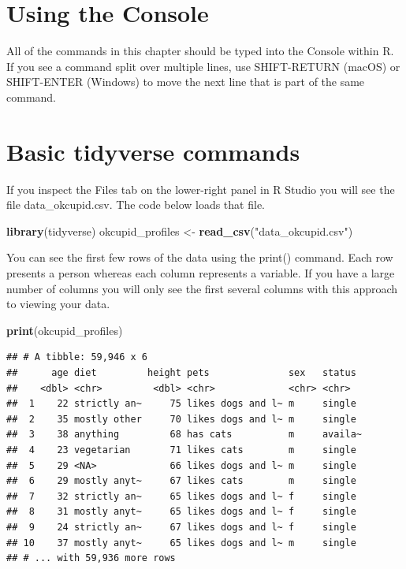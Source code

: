 \documentclass[
]{krantz}
\makeatletter
\newenvironment{Shaded}{\begin{snugshade}}{\end{snugshade}}
\newcommand{\KeywordTok}[1]{\textcolor[rgb]{0.27,0.27,0.27}{\textbf{#1}}}
\newcommand{\NormalTok}[1]{#1}
\newcommand{\StringTok}[1]{\textcolor[rgb]{0.5,0.5,0.5}{#1}}
\newenvironment{kframe}{%
\medskip{}
\setlength{\fboxsep}{.8em}
 \def\at@end@of@kframe{}%
 \ifinner\ifhmode%
  \def\at@end@of@kframe{\end{minipage}}%
  \begin{minipage}{\columnwidth}%
 \fi\fi%
 \def\FrameCommand##1{\hskip\@totalleftmargin \hskip-\fboxsep
 \colorbox{shadecolor}{##1}\hskip-\fboxsep
     \hskip-\linewidth \hskip-\@totalleftmargin \hskip\columnwidth}%
 \MakeFramed {\advance\hsize-\width
   \@totalleftmargin\z@ \linewidth\hsize
   \@setminipage}}%
 {\par\unskip\endMakeFramed%
 \at@end@of@kframe}
\renewenvironment{Shaded}{\begin{kframe}}{\end{kframe}}
\makeatother
\begin{document}
\hypertarget{using-the-console}{%
\section{Using the Console}\label{using-the-console}}

All of the commands in this chapter should be typed into the Console within R. If you see a command split over multiple lines, use SHIFT-RETURN (macOS) or SHIFT-ENTER (Windows) to move the next line that is part of the same command.

\hypertarget{basic-tidyverse-commands}{%
\section{Basic tidyverse commands}\label{basic-tidyverse-commands}}

If you inspect the Files tab on the lower-right panel in R Studio you will see the file data\_okcupid.csv. The code below loads that file.

\begin{Shaded}
\begin{Highlighting}[]
\KeywordTok{library}\NormalTok{(tidyverse)}
\NormalTok{okcupid_profiles <-}\StringTok{ }\KeywordTok{read_csv}\NormalTok{(}\StringTok{"data_okcupid.csv"}\NormalTok{)}
\end{Highlighting}
\end{Shaded}

You can see the first few rows of the data using the print() command. Each row presents a person whereas each column represents a variable. If you have a large number of columns you will only see the first several columns with this approach to viewing your data.

\begin{Shaded}
\begin{Highlighting}[]
\KeywordTok{print}\NormalTok{(okcupid_profiles)}
\end{Highlighting}
\end{Shaded}

\begin{verbatim}
## # A tibble: 59,946 x 6
##      age diet         height pets              sex   status 
##    <dbl> <chr>         <dbl> <chr>             <chr> <chr>  
##  1    22 strictly an~     75 likes dogs and l~ m     single 
##  2    35 mostly other     70 likes dogs and l~ m     single 
##  3    38 anything         68 has cats          m     availa~
##  4    23 vegetarian       71 likes cats        m     single 
##  5    29 <NA>             66 likes dogs and l~ m     single 
##  6    29 mostly anyt~     67 likes cats        m     single 
##  7    32 strictly an~     65 likes dogs and l~ f     single 
##  8    31 mostly anyt~     65 likes dogs and l~ f     single 
##  9    24 strictly an~     67 likes dogs and l~ f     single 
## 10    37 mostly anyt~     65 likes dogs and l~ m     single 
## # ... with 59,936 more rows
\end{verbatim}
\end{document}

